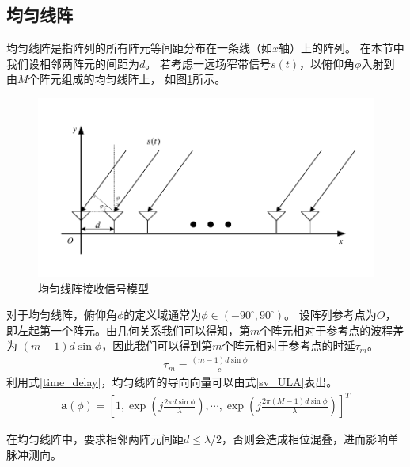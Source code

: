 \documentclass[master]{thesis-uestc}
\begin{document}
\subsection{均匀线阵}
均匀线阵是指阵列的所有阵元等间距分布在一条线（如$x$轴）上的阵列。
在本节中我们设相邻两阵元的间距为$d$。
若考虑一远场窄带信号$s(t)$，以俯仰角$\phi$入射到由$M$个阵元组成的均匀线阵上，
如图\ref{ULA}所示。
\begin{figure}[h]
\includegraphics[scale=0.8]{pic/ULA.pdf}
\caption{均匀线阵接收信号模型}
\label{ULA}
\end{figure}

对于均匀线阵，俯仰角$\phi$的定义域通常为$\phi\in\left(-90^\circ,90^\circ\right)$。
设阵列参考点为$O$，即左起第一个阵元。由几何关系我们可以得知，第$m$个阵元相对于参考点的波程差为
$(m-1)d\sin\phi$，因此我们可以得到第$m$个阵元相对于参考点的时延$\tau_m$。
\begin{equation}\label{time_delay}
    \begin{aligned}
    \tau_m = \frac{(m-1)d\sin\phi}{c}
    \end{aligned}
\end{equation}
利用式\eqref{time_delay}，均匀线阵的导向向量可以由式\eqref{sv_ULA}表出。
\begin{equation}\label{sv_ULA}
    \begin{aligned}
        \bm{a}(\phi) = 
        \left[
        1,
        \exp\left(j\frac{2\pi d\sin\phi}{\lambda}\right),
        \cdots,
        \exp\left(j\frac{2\pi(M-1)d\sin\phi}{\lambda}\right)
        \right]^T
    \end{aligned}
\end{equation}

在均匀线阵中，要求相邻两阵元间距$d\leq\lambda/2$，否则会造成相位混叠，进而影响单脉冲测向。
\end{document}
